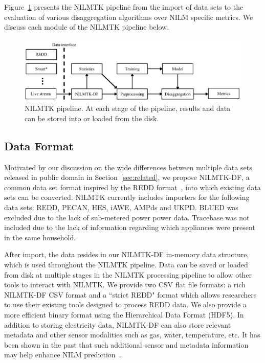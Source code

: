 \documentclass{sig-alternate}
\newcommand{\bluecolor}[1]{\textcolor{blue}{#1}}
\newcommand{\figref}[1]{Figure~\ref{#1}}
\newcommand{\secref}[1]{Section~\ref{#1}}
\begin{document}
\figref{fig:pipeline} presents the NILMTK pipeline from the import of data sets to the evaluation of various disaggregation algorithms over NILM specific metrics. We discuss each module of the NILMTK pipeline below.

\begin{figure}
\centering \includegraphics[scale=0.6]{figures/pipeline.pdf}
\caption{NILMTK pipeline. At each stage of the pipeline, results and data can be stored into or loaded from the disk.}
\label{fig:pipeline}
\end{figure}


\subsection{Data Format}%

\noindent
Motivated by our discussion on the wide differences between multiple data sets released in public domain in \secref{sec:related}, we propose NILMTK-DF, a common
data set format inspired by the REDD format~\cite{redd}, into which
existing data sets can be converted. NILMTK currently includes
importers for the following data sets: REDD, PECAN, HES, iAWE, AMPds
and UKPD. BLUED was excluded due to the lack of sub-metered power power data. Tracebase was not included due to the lack of information regarding which appliances were present in the same household.

After import, the data resides in our NILMTK-DF in-memory data structure, which is used throughout the NILMTK pipeline. Data can be saved or loaded from disk at multiple stages in the NILMTK processing pipeline to allow other tools to interact with NILMTK.  We provide two CSV flat file formats: a rich NILMTK-DF CSV format and a ``strict REDD" format which allows researchers to use their existing tools designed to process REDD data.  We also provide a more efficient binary format using the Hierarchical Data Format (HDF5).  In addition to storing electricity data, NILMTK-DF can also store relevant metadata and other sensor modalities such as gas, water, temperature, etc. It has been shown in the past that such additional sensor and metadata information may help enhance NILM prediction~\cite{schoofs_2010}. 
\end{document}
